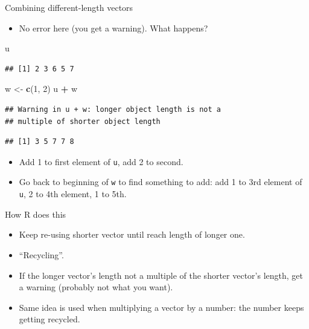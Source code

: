 \documentclass[ignorenonframetext,]{beamer}
\newenvironment{Shaded}{\begin{snugshade}}{\end{snugshade}}
\newcommand{\DecValTok}[1]{\textcolor[rgb]{0.00,0.00,0.81}{#1}}
\newcommand{\KeywordTok}[1]{\textcolor[rgb]{0.13,0.29,0.53}{\textbf{#1}}}
\newcommand{\NormalTok}[1]{#1}
\newcommand{\OperatorTok}[1]{\textcolor[rgb]{0.81,0.36,0.00}{\textbf{#1}}}
\newcommand{\StringTok}[1]{\textcolor[rgb]{0.31,0.60,0.02}{#1}}
\providecommand{\tightlist}{%
  \setlength{\itemsep}{0pt}\setlength{\parskip}{0pt}}
\begin{document}
\begin{frame}[fragile]{Combining different-length vectors}
\protect\hypertarget{combining-different-length-vectors}{}

\begin{itemize}
\tightlist
\item
  No error here (you get a warning). What happens?
\end{itemize}

\begin{Shaded}
\begin{Highlighting}[]
\NormalTok{u}
\end{Highlighting}
\end{Shaded}

\begin{verbatim}
## [1] 2 3 6 5 7
\end{verbatim}

\begin{Shaded}
\begin{Highlighting}[]
\NormalTok{w <-}\StringTok{ }\KeywordTok{c}\NormalTok{(}\DecValTok{1}\NormalTok{, }\DecValTok{2}\NormalTok{)}
\NormalTok{u }\OperatorTok{+}\StringTok{ }\NormalTok{w}
\end{Highlighting}
\end{Shaded}

\begin{verbatim}
## Warning in u + w: longer object length is not a
## multiple of shorter object length
\end{verbatim}

\begin{verbatim}
## [1] 3 5 7 7 8
\end{verbatim}

\begin{itemize}
\tightlist
\item
  Add 1 to first element of \texttt{u}, add 2 to second.
\item
  Go back to beginning of \texttt{w} to find something to add: add 1 to
  3rd element of \texttt{u}, 2 to 4th element, 1 to 5th.
\end{itemize}

\end{frame}

\begin{frame}{How R does this}
\protect\hypertarget{how-r-does-this}{}

\begin{itemize}
\tightlist
\item
  Keep re-using shorter vector until reach length of longer one.
\item
  ``Recycling''.
\item
  If the longer vector's length not a multiple of the shorter vector's
  length, get a warning (probably not what you want).
\item
  Same idea is used when multiplying a vector by a number: the number
  keeps getting recycled.
\end{itemize}

\end{frame}
\end{document}
